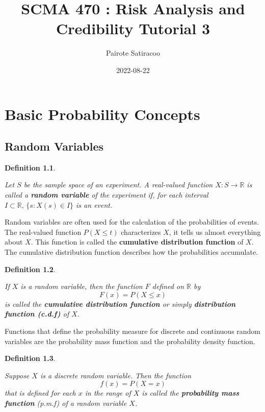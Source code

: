 \documentclass[landscape, 20pt]{extreport}
\title{\textbf{SCMA 470 : Risk Analysis and Credibility} \textbf{Tutorial 3}}
\author{Pairote Satiracoo}
\date{2022-08-22}
\theoremstyle{definition}
\newtheorem{definition}{Definition}[chapter]
\theoremstyle{definition}
\theoremstyle{definition}
\theoremstyle{definition}
\theoremstyle{remark}
\begin{document}
\maketitle

{
\setcounter{tocdepth}{1}
}
\hypertarget{basic-probability-concepts}{%
\chapter{Basic Probability Concepts}\label{basic-probability-concepts}}

\hypertarget{random-variables}{%
\section{Random Variables}\label{random-variables}}

\begin{definition}
\protect\hypertarget{def:unlabeled-div-1}{}\label{def:unlabeled-div-1}

\emph{Let \(S\) be the sample space of an experiment. A
real-valued function \(X : S \rightarrow \mathbb{R}\) is called a \textbf{random
variable} of the experiment if, for each interval
\(I \subset \mathbb{R}, \, \{s : X(s) \in I \}\) is an event. }

\end{definition}

Random variables are often used for the calculation of the probabilities
of events. The real-valued function \(P(X \le t)\) characterizes \(X\), it
tells us almost everything about \(X\). This function is called the
\textbf{cumulative distribution function} of \(X\). The cumulative distribution
function describes how the probabilities accumulate.

\begin{definition}
\protect\hypertarget{def:unlabeled-div-2}{}\label{def:unlabeled-div-2}

\emph{If \(X\) is a random variable, then the function \(F\)
defined on \(\mathbb{R}\) by \[F(x) = P(X \le x)\] is called the
\textbf{cumulative distribution function} or simply \textbf{distribution function
(c.d.f)} of \(X\).}

\end{definition}

Functions that define the probability measure for discrete and
continuous random variables are the probability mass function and the
probability density function.

\begin{definition}
\protect\hypertarget{def:unlabeled-div-3}{}\label{def:unlabeled-div-3}

\emph{Suppose \(X\) is a discrete random variable. Then the
function \[f(x) = P(X = x)\] that is defined for each \(x\) in the range
of \(X\) is called the \textbf{probability mass function} (p.m.f) of a random
variable \(X\).}

\end{definition}
\end{document}

